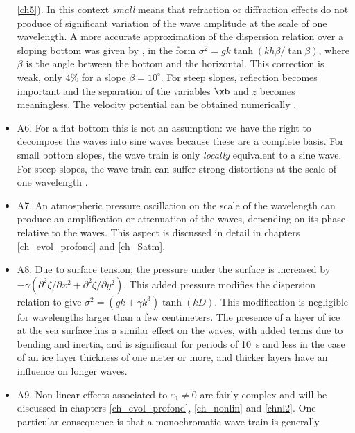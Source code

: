 \begin{itemize}
  \ref{ch5}). In this context \emph{small} means that refraction or diffraction effects do not produce of significant variation 
of the wave amplitude at the scale of one wavelength. A more accurate approximation of the dispersion relation 
over a sloping bottom was given by 
   \cite{Ehrenmark2005}, in the form 
   $\sigma^2=gk \tanh(kh \beta /\tan \beta)$, where $\beta$ is the angle between the bottom and the horizontal. This correction is 
weak, only 4\% for a slope $\beta=10^\circ$. For steep slopes, reflection becomes important and the separation of the 
variables $\xb$ and $z$ becomes meaningless. The velocity potential can be obtained numerically 
  \citep[e.g.][]{Athanassoulis&Belibassakis1999,Belibassakis&al.2001}.\vspace{0.3cm}
  \item A6. For a flat bottom this is not an assumption: we have the right to decompose the waves into sine waves because these 
are a complete basis. For small bottom slopes, the wave train is only \emph{locally} equivalent to a sine wave. 
For steep slopes, the wave train can suffer strong distortions at the scale of one wavelength \citep[e.g.][]{Magne&al.2007}.\vspace{0.3cm}
  \item A7. An atmospheric pressure oscillation on the scale of the wavelength can produce an amplification or attenuation of the waves, depending 
on its phase relative to the waves. This aspect is discussed in detail in chapters \ref{ch_evol_profond} and \ref{ch_Satm}. \vspace{0.3cm}
  \item A8. Due to surface tension, the pressure under the surface is increased by  $-\gamma \left(\partial^2 \zeta/\partial x^2+\partial^2 \zeta/\partial
  y^2\right)$. This added pressure modifies the dispersion relation to give $\sigma^2=\left(gk+\gamma k^3\right) \tanh(kD)$. 
  This modification is negligible for wavelengths larger than a few centimeters. The presence of a layer of ice at the sea surface 
has a similar effect on the waves, with added terms due to bending and inertia, and is significant for periods of 10~s and 
less \citep{Liu&MolloChristensen1988} in the case of an ice layer thickness of one meter or more, and  thicker layers have an influence on longer waves.
  \item A9. Non-linear effects associated to $\varepsilon_1 \neq 0$ are fairly complex and will be 
discussed in chapters \ref{ch_evol_profond}, \ref{ch_nonlin} and \ref{chnl2}. 
One particular consequence is that a monochromatic wave train is generally 

\end{itemize}
